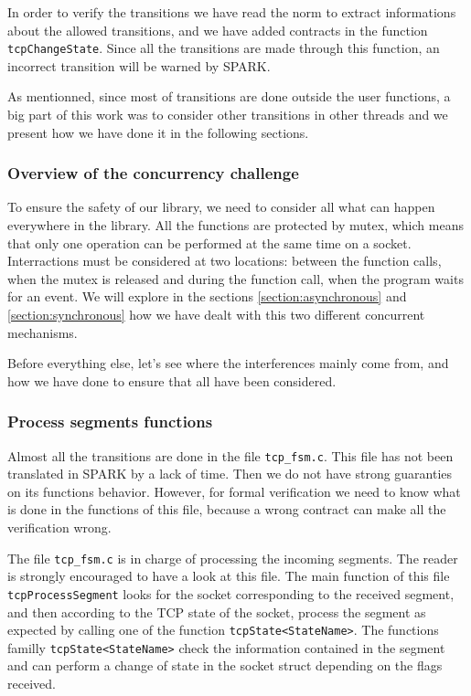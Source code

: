 \documentclass[a4paper, 10pt]{article}
\begin{document}
    In order to verify the transitions we have read the norm to extract informations about
    the allowed transitions, and we have added contracts in the function
    \lstinline[language=Ada]{tcpChangeState}. Since all the transitions are made through
    this function, an incorrect transition will be warned by SPARK.

    As mentionned, since most of transitions are done outside the user functions, a big part
    of this work was to consider other transitions in other threads and we present how we have
    done it in the following sections.

    \subsubsection{Overview of the concurrency challenge}

    To ensure the safety of our library, we need to consider all what can happen everywhere in
    the library. All the functions are protected by mutex, which means that only one operation
    can be performed at the same time on a socket. Interractions must be considered at two
    locations: between the function calls, when the mutex is released and during the function
    call, when the program waits for an event. We will explore in the sections \ref{section:asynchronous}
    and \ref{section:synchronous} how we have dealt with this two different concurrent mechanisms.

    Before everything else, let's see where the interferences mainly come from, and how we have
    done to ensure that all have been considered.

    \subsubsection{Process segments functions}

    Almost all the transitions are done in the file \texttt{tcp\_fsm.c}. This file has not been
    translated in SPARK by a lack of time. Then we do not have strong guaranties on its functions
    behavior. However, for formal verification we need to know what is done in the functions of
    this file, because a wrong contract can make all the verification wrong.

    The file \texttt{tcp\_fsm.c} is in charge of processing the incoming segments. The reader is
    strongly encouraged to have a look at this file. The main function of this file
    \texttt{tcpProcessSegment} looks for the socket corresponding to the received segment, and then
    according to the TCP state of the socket, process the segment as expected by calling one of
    the function \texttt{tcpState<StateName>}. The functions familly \texttt{tcpState<StateName>}
    check the information contained in the segment and can perform a change of state in the socket
    struct depending on the flags received.
\end{document}
